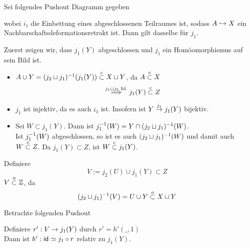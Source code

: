 \Satz{}
Sei folgendes Pushout Diagramm gegeben
\begin{center}
\end{center}
wobei $i_1$ die Einbettung eines abgeschlossenen Teilraumes ist, sodass $A\overset{}{\hookrightarrow} X$ ein Nachbarschaftsdeformationsretrakt ist. Dann gilt dasselbe für $j_1$.

\begin{Beweis}{}
Zuerst zeigen wir, dass $j_1(Y)$ abgeschlossen und $j_1$ ein Homöomorphismus auf sein Bild ist.
\begin{itemize}
\item $A\cup Y = (j_2\sqcup j_1)^{-1}(j_1(Y)) \overset{c}{\subset} X \sqcup Y $, da $A \overset{c}{\subset} X$
\[ \overset{j_1\sqcup j_2 \text{ Id.}}{\Longrightarrow} j_1(Y) \overset{c}{\subset} Z  \]
\item $j_1$ ist injektiv, da es auch $i_1$ ist. Insofern ist $Y \overset{j_1}{\rightarrow}j_1(Y)$ bijektiv.
\item Sei $W \subset j_1(Y)$. Dann ist $j_1^{-1}(W) = Y \cap (j_2\sqcup j_1)^{-1}(W)$.\\
Ist $j_1^{-1}(W)$ abgeschlossen, so ist es auch $(j_2\sqcup j_1)^{-1}(W)$ und damit auch $W\overset{c}{\subset} Z$. Da $j_1(Y) \subset Z$, ist $W \overset{c}{\subset} j_1(Y)$.
\end{itemize}

Definiere
\[V := j_2(U) \cup j_1(Y) \subset Z\]
$V \overset{o}{\subset} \mathbb{Z}$, da
\[ (j_2\sqcup j_1)^{-1} (V) = U \cup Y \overset{o}{\subset} X \sqcup Y\]

Betrachte folgenden Pushout
\begin{center}
\end{center}
Definiere $r' : V \overset{}{\rightarrow}j_1(Y)$ durch $r' = h'(\_, 1)$\\
Dann ist $h' : \textsf{id}_{} \simeq j_1\circ r$ relativ zu $j_1(Y)$.
\end{Beweis}

